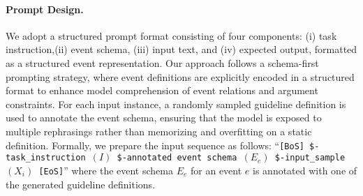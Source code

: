 \paragraph{Prompt Design.}
\label{sec:prompt-design}
We adopt a structured prompt format consisting of four components: (i) task instruction,(ii) event schema, (iii) input text, and (iv) expected output, formatted as a structured event representation. Our approach follows a schema-first prompting strategy, where event definitions are explicitly encoded in a structured format to enhance model comprehension of event relations and argument constraints. For each input instance, a randomly sampled guideline definition is used to annotate the event schema, ensuring that the model is exposed to multiple rephrasings rather than memorizing and overfitting on a static definition. Formally, we prepare the input sequence as follows: ``\texttt{[BoS] \$-task\_instruction $(I)$ \$-annotated event schema $({E}_e)$~\$-input\_sample~$(X_i)$~[EoS]}'' where  the event schema ${E}_e$ for an event $e$ is annotated with one of the generated guideline definitions. 

%         




